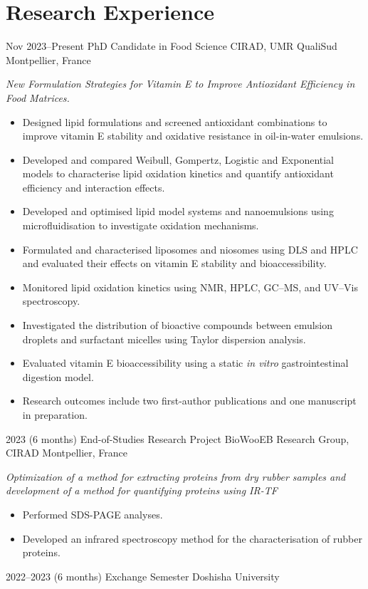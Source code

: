 \documentclass[11pt,a4paper,sans]{moderncv}
\begin{document}
{\section{Research Experience}
\cventry
{Nov 2023--Present}
{PhD Candidate in Food Science}
{CIRAD, UMR QualiSud}
{Montpellier, France}
{}
{%
\emph{New Formulation Strategies for Vitamin E to Improve Antioxidant Efficiency in Food Matrices.}
\begin{itemize}[leftmargin=*,nosep]
\item Designed lipid formulations and screened antioxidant combinations to improve vitamin E stability and oxidative resistance in oil-in-water emulsions.
\item Developed and compared Weibull, Gompertz, Logistic and Exponential models to characterise lipid oxidation kinetics and quantify antioxidant efficiency and interaction effects.
\item Developed and optimised lipid model systems and nanoemulsions using microfluidisation to investigate oxidation mechanisms.
\item Formulated and characterised liposomes and niosomes using DLS and HPLC and evaluated their effects on vitamin E stability and bioaccessibility.
\item Monitored lipid oxidation kinetics using NMR, HPLC, GC--MS, and UV--Vis spectroscopy.
\item Investigated the distribution of bioactive compounds between emulsion droplets and surfactant micelles using Taylor dispersion analysis.
\item Evaluated vitamin E bioaccessibility using a static \emph{in vitro} gastrointestinal digestion model.
\item Research outcomes include two first-author publications and one manuscript in preparation.
\end{itemize}%
}
\cventry
{2023 (6 months)}
{End-of-Studies Research Project}
{BioWooEB Research Group, CIRAD}
{Montpellier, France}
{}
{%
\emph{Optimization of a method for extracting proteins from dry rubber samples and development of a method for quantifying proteins using IR-TF}
\begin{itemize}[leftmargin=*,nosep]
    \item Performed SDS-PAGE analyses.
    \item Developed an infrared spectroscopy method for the characterisation
    of rubber proteins.
\end{itemize}%
}
\cventry
{2022--2023 (6 months)}
{Exchange Semester}
{Doshisha University}
}
\end{document}
